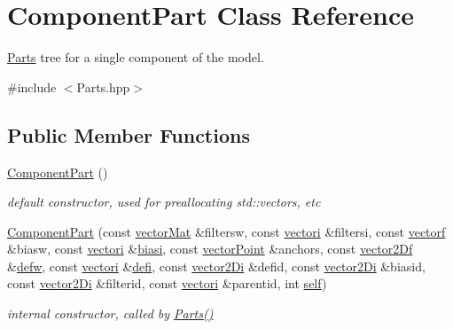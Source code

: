 \hypertarget{class_component_part}{\section{Component\-Part Class Reference}
\label{class_component_part}
}


\hyperlink{class_parts}{Parts} tree for a single component of the model.  




{\ttfamily \#include $<$Parts.\-hpp$>$}

\subsection*{Public Member Functions}
\begin{DoxyCompactItemize}
\item 
\hyperlink{class_component_part_add8b8160fe16adc84ba35f2ea9434ea1}{Component\-Part} ()
\begin{DoxyCompactList}\small\item\em default constructor, used for preallocating std\-::vectors, etc \end{DoxyCompactList}\item 
\hyperlink{class_component_part_a922c7a82e491009d996ac41beb947b40}{Component\-Part} (const \hyperlink{types_8hpp_a3207a7addcfa415d1c83622febcb1e9b}{vector\-Mat} \&filtersw, const \hyperlink{types_8hpp_a44529587d60e73bf0e689a82e5e70a55}{vectori} \&filtersi, const \hyperlink{types_8hpp_a4da5db3ee9e284f719ef5764dbadffc8}{vectorf} \&biasw, const \hyperlink{types_8hpp_a44529587d60e73bf0e689a82e5e70a55}{vectori} \&\hyperlink{class_component_part_a8c5fde49dae3ab679454a106a9e41be8}{biasi}, const \hyperlink{types_8hpp_ac468fcf6870d6563ac8fa3669845afcc}{vector\-Point} \&anchors, const \hyperlink{types_8hpp_a94f2d563f3725231a6f684b4dce4f1ef}{vector2\-Df} \&\hyperlink{class_component_part_a9dfb0fd739381be92d5ce2eab5054681}{defw}, const \hyperlink{types_8hpp_a44529587d60e73bf0e689a82e5e70a55}{vectori} \&\hyperlink{class_component_part_ae1d71f86350d8757e33bbeb1af85f4fa}{defi}, const \hyperlink{types_8hpp_a93a5e2cfd40d1ff1f10d8bbf11884c41}{vector2\-Di} \&defid, const \hyperlink{types_8hpp_a93a5e2cfd40d1ff1f10d8bbf11884c41}{vector2\-Di} \&biasid, const \hyperlink{types_8hpp_a93a5e2cfd40d1ff1f10d8bbf11884c41}{vector2\-Di} \&filterid, const \hyperlink{types_8hpp_a44529587d60e73bf0e689a82e5e70a55}{vectori} \&parentid, int \hyperlink{class_component_part_abe27079725188a3cb881459a6ba0abc5}{self})
\begin{DoxyCompactList}\small\item\em internal constructor, called by \hyperlink{class_parts}{Parts()} \end{DoxyCompactList}\item 

\end{DoxyCompactItemize}
